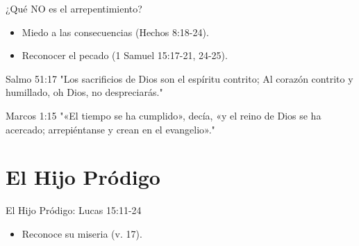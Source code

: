 \documentclass[17pt, aspectratio=169]{beamer}
\begin{document}
\begin{frame}{¿Qué NO es el arrepentimiento?}
    \begin{itemize}
        \item Miedo a las consecuencias (Hechos 8:18-24).
        \item Reconocer el pecado (1 Samuel 15:17-21, 24-25).
    \end{itemize}

    \begin{citaBiblicaSlide}{Salmo 51:17}
        "Los sacrificios de Dios son el espíritu contrito;
Al corazón contrito y humillado, oh Dios, no despreciarás."
    \end{citaBiblicaSlide}
    
\end{frame}

\begin{frame}{}

    \begin{citaBiblicaSlide}{Marcos 1:15}
        "«El tiempo se ha cumplido», decía, «y el reino de Dios se ha acercado; arrepiéntanse y crean en el evangelio»."
    \end{citaBiblicaSlide}
    
\end{frame}

    
    


\section{El Hijo Pr\'odigo}

\begin{frame}{El Hijo Pr\'odigo: Lucas 15:11-24}
    \begin{itemize}
        \item Reconoce su miseria (v. 17).
        
    \end{itemize}
\end{frame}
\end{document}
